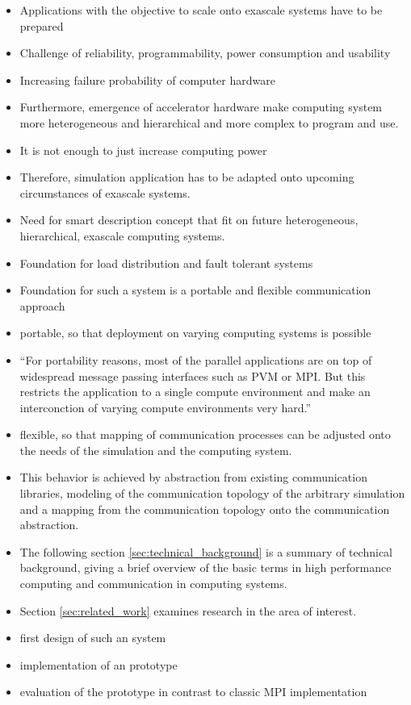 \begin{itemize}
\item Applications with the objective to scale onto exascale systems
  have to be prepared
\item Challenge of reliability, programmability, power consumption and
  usability
\item Increasing failure probability of computer hardware
\item Furthermore, emergence of accelerator hardware make computing
  system more heterogeneous and hierarchical and more complex to
  program and use.
\item It is not enough to just increase computing power
\item Therefore, simulation application has to be adapted onto
  upcoming circumstances of exascale systems.
\item Need for smart description concept that fit on future
  heterogeneous, hierarchical, exascale computing systems.
\item Foundation for load distribution and fault tolerant systems

\item Foundation for such a system is a portable and flexible
  communication approach
\item portable, so that deployment on varying computing systems is
  possible
\item ``For portability reasons, most of the parallel applications are on top
  of widespread message passing interfaces such as PVM or MPI. But
  this restricts the application to a single compute environment and
  make an interconction of varying compute environments very hard.''
\item flexible, so that mapping of communication processes can be
  adjusted onto the needs of the simulation and the computing system.
\item This behavior is achieved by abstraction from existing
  communication libraries, modeling of the communication topology of
  the arbitrary simulation and a mapping from the communication
  topology onto the communication abstraction.

\item The following section \ref{sec:technical_background} is a
  summary of technical background, giving a brief overview of the
  basic terms in high performance computing and communication in
  computing systems.
\item Section \ref{sec:related_work} examines research in the
  area of interest.
\item first design of such an system
\item implementation of an prototype
\item evaluation of the prototype in contrast to classic MPI implementation

\end{itemize}


\cleardoublepage

